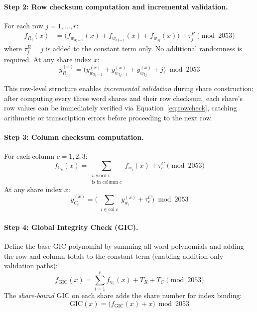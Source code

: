 \documentclass[11pt]{article}
\begin{document}
\paragraph{Step 2: Row checksum computation and incremental validation.} For each row $j = 1, \ldots, r$:
\begin{align}
    f_{R_j}(x) &= \bigl(f_{w_{3j-2}}(x) + f_{w_{3j-1}}(x) + f_{w_{3j}}(x)\bigr) + \tau^R_j \pmod{2053} \label{eq:rowpoly}
\end{align}
where $\tau^R_j = j$ is added to the constant term only. No additional randomness is required. At any share index $x$:
\begin{equation}
    y_{R_j}^{(x)} = \bigl(y_{w_{3j-2}}^{(x)} + y_{w_{3j-1}}^{(x)} + y_{w_{3j}}^{(x)} + j\bigr) \bmod 2053 \label{eq:rowcheck}
\end{equation}

This row-level structure enables \emph{incremental validation} during share construction: after computing every three word shares and their row checksum, each share's row values can be immediately verified via Equation~\eqref{eq:rowcheck}, catching arithmetic or transcription errors before proceeding to the next row.

\paragraph{Step 3: Column checksum computation.} For each column $c = 1, 2, 3$:
\begin{equation}
    f_{C_c}(x) = \sum_{\substack{i : \text{word } i \\ \text{is in column } c}} f_{w_i}(x) + \tau^C_c \pmod{2053} \label{eq:colpoly}
\end{equation}
At any share index $x$:
\begin{equation}
    y_{C_c}^{(x)} = \biggl(\sum_{\substack{i \in \text{col } c}} y_{w_i}^{(x)} + \tau^C_c\biggr) \bmod 2053 \label{eq:colcheck}
\end{equation}

\paragraph{Step 4: Global Integrity Check (GIC).} Define the base GIC polynomial by summing all word polynomials and adding the row and column totals to the constant term (enabling addition-only validation paths):
\begin{equation}
    f_{\text{GIC}}(x) = \sum_{i=1}^{\ell} f_{w_i}(x) + T_R + T_C \pmod{2053} \label{eq:gicpoly}
\end{equation}
The \emph{share-bound} GIC on each share adds the share number for index binding:
\begin{equation}
    \text{GIC}(x) = \bigl(f_{\text{GIC}}(x) + x\bigr) \bmod 2053 \label{eq:printedgic}
\end{equation}
\end{document}
